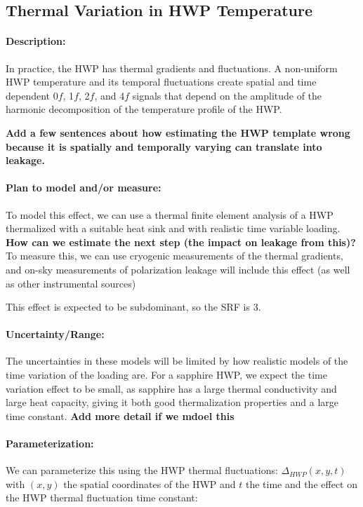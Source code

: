 \subsection{Thermal Variation in HWP Temperature}

\paragraph{Description:}
In practice, the HWP has thermal gradients and fluctuations. A non-uniform HWP temperature and its temporal fluctuations create spatial and time dependent 0$f$, 1$f$, 2$f$, and 4$f$ signals that depend on the amplitude of the harmonic decomposition of the temperature profile of the HWP. 

\textbf{Add a few sentences about how estimating the HWP template wrong because it is spatially and temporally varying can translate into leakage.}

\paragraph{Plan to model and/or measure:}
To model this effect, we can use a thermal finite element analysis of a HWP thermalized with a suitable heat sink and with realistic time variable loading. \textbf{How can we estimate the next step (the impact on leakage from this)?}
To measure this, we can use cryogenic measurements of the thermal gradients, and on-sky measurements of polarization leakage will include this effect (as well as other instrumental sources)

This effect is expected to be subdominant, so the SRF is 3.


\paragraph{Uncertainty/Range:}
The uncertainties in these models will be limited by how realistic models of the time variation of the loading are. For a sapphire HWP, we expect the time variation effect to be small, as sapphire has a large thermal conductivity and large heat capacity, giving it both good thermalization properties and a large time constant.
 \textbf{Add more detail if we mdoel this}

\paragraph{Parameterization:}
We can parameterize this using the HWP thermal fluctuations: $\Delta_{HWP}(x,y,t)$ with $(x,y)$ the spatial coordinates of the HWP and $t$ the time and the effect on the HWP thermal fluctuation time constant: 

